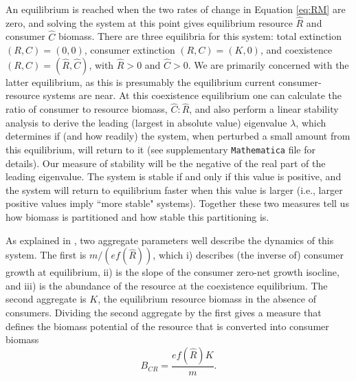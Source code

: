 \documentclass[11pt]{article}
\begin{document}
An equilibrium is reached when the two rates of change in Equation \eqref{eq:RM} are zero, and solving the system at this point gives equilibrium resource $\hat{R}$ and consumer $\hat{C}$ biomass.
There are three equilibria for this system: total extinction $(R,C) = (0,0)$, consumer extinction $(R,C)=(K,0)$, and coexistence $(R,C)=(\hat{R},\hat{C})$, with $\hat{R}>0$ and $\hat{C}>0$.
We are primarily concerned with the latter equilibrium, as this is presumably the equilibrium current consumer-resource systems are near. %
At this coexistence equilibrium one can calculate the ratio of consumer to resource biomass, $\hat{C}:\hat{R}$, and also perform a linear stability analysis to derive the leading (largest in absolute value) eigenvalue $\lambda$, which determines if (and how readily) the system, when perturbed a small amount from this equilibrium, will return to it (see supplementary \texttt{Mathematica} file for details).
Our measure of stability will be the negative of the real part of the leading eigenvalue.
The system is stable if and only if this value is positive, and the system will return to equilibrium faster when this value is larger (i.e., larger positive values imply ``more stable" systems).
Together these two measures tell us how biomass is partitioned and how stable this partitioning is.

As explained in \cite{Gilbert2014}, two aggregate parameters well describe the dynamics of this system.
The first is $m /(e f(\hat{R}))$, which i) describes (the inverse of) consumer growth at equilibrium, ii) is the slope of the consumer zero-net growth isocline, and iii) is the abundance of the resource at the coexistence equilibrium.
The second aggregate is $K$, the equilibrium resource biomass in the absence of consumers.
Dividing the second aggregate by the first gives a measure that defines the biomass potential of the resource that is converted into consumer biomass \[B_{CR} = \frac{e f(\hat{R}) K}{m}.\]
\end{document}
